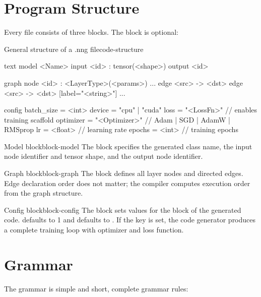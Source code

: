 \documentclass{nngraph-en}
\begin{document}
\section{Program Structure}

Every  file consists of three blocks. The  block is optional:

\begin{codebox}{General structure of a .nng file}{code-structure}
\begin{amzcode}{text}
model <Name> {
    input  <id> : tensor(<shape>)
    output <id>
}

graph {
    node <id> : <LayerType>(<params>)
    ...
    edge <src> -> <dst>
    edge <src> -> <dst> [label="<string>"]
    ...
}

config {
    batch_size = <int>
    device     = "cpu" | "cuda"
    loss       = "<LossFn>"       // enables training scaffold
    optimizer  = "<Optimizer>"    // Adam | SGD | AdamW | RMSprop
    lr         = <float>          // learning rate
    epochs     = <int>            // training epochs
}
\end{amzcode}
\end{codebox}

\begin{dfnbox}{Model block}{block-model}
The  block specifies the generated class name, the input node identifier and tensor shape, and the output node identifier.
\end{dfnbox}

\begin{dfnbox}{Graph block}{block-graph}
The  block defines all layer nodes and directed edges. Edge declaration order does not matter; the compiler computes execution order from the graph structure.
\end{dfnbox}

\begin{dfnbox}{Config block}{block-config}
The  block sets values for the  block of the generated code.  defaults to 1 and  defaults to . If the  key is set, the code generator produces a complete training loop with optimizer and loss function.
\end{dfnbox}

\section{Grammar}

The grammar is simple and short, complete grammar rules:
\end{document}
